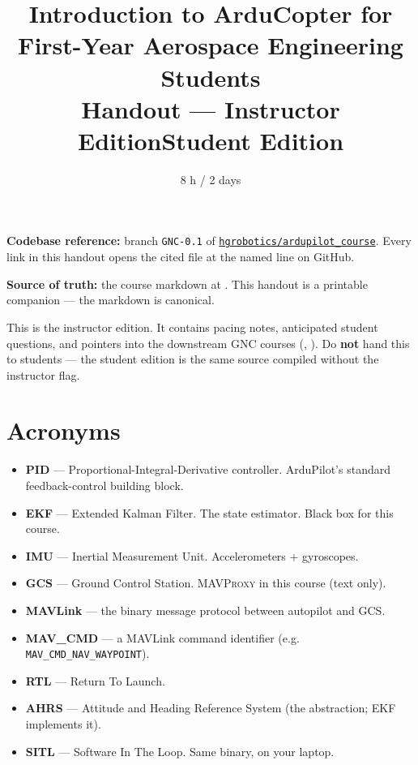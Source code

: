 \documentclass[a4paper,11pt,twoside]{article}
\title{Introduction to ArduCopter for First-Year Aerospace Engineering Students\\
  \large Handout --- \ifinstructor Instructor Edition\else Student Edition\fi}
\author{\copyrightline}
\date{8 h / 2 days}
\begin{document}
\maketitle

\noindent\textbf{Codebase reference:} branch \texttt{GNC-0.1} of \href{\repourl}{\nolinkurl{hgrobotics/ardupilot_course}}. Every link in this handout opens the cited file at the named line on GitHub.

\noindent\textbf{Source of truth:} the course markdown at . This handout is a printable companion --- the markdown is canonical.

\ifinstructor
\begin{tcolorbox}[colback=red!5!white,colframe=red!40!black,title=Instructor edition]
This is the instructor edition. It contains pacing notes, anticipated student questions, and pointers into the downstream GNC courses (\siblingplane, \siblingquadplane). Do \textbf{not} hand this to students --- the student edition is the same source compiled without the instructor flag.
\end{tcolorbox}
\fi

\section*{Acronyms}
\begin{itemize}
  \item \textbf{PID} --- Proportional-Integral-Derivative controller. ArduPilot's standard feedback-control building block.
  \item \textbf{EKF} --- Extended Kalman Filter. The state estimator. Black box for this course.
  \item \textbf{IMU} --- Inertial Measurement Unit. Accelerometers + gyroscopes.
  \item \textbf{GCS} --- Ground Control Station. \textsc{MAVProxy} in this course (text only).
  \item \textbf{MAVLink} --- the binary message protocol between autopilot and GCS.
  \item \textbf{MAV\_CMD} --- a MAVLink command identifier (e.g. \texttt{MAV\_CMD\_NAV\_WAYPOINT}).
  \item \textbf{RTL} --- Return To Launch.
  \item \textbf{AHRS} --- Attitude and Heading Reference System (the abstraction; EKF implements it).
  \item \textbf{SITL} --- Software In The Loop. Same binary, on your laptop.
\end{itemize}
\end{document}
